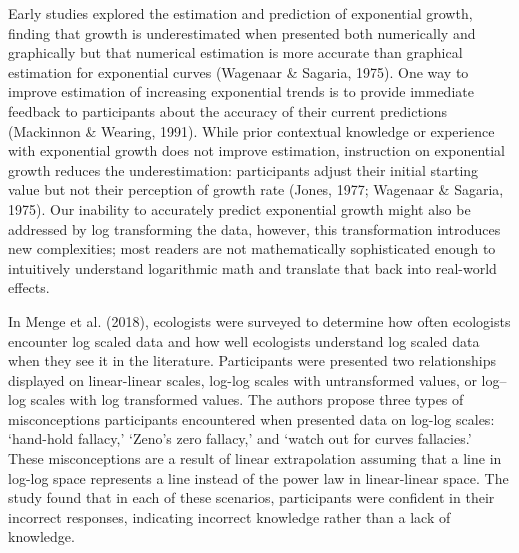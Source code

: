 \documentclass[print]{nuthesis}
\begin{document}
Early studies explored the estimation and prediction of exponential growth, finding that growth is underestimated when presented both numerically and graphically but that numerical estimation is more accurate than graphical estimation for exponential curves (Wagenaar \& Sagaria, 1975).
One way to improve estimation of increasing exponential trends is to provide immediate feedback to participants about the accuracy of their current predictions (Mackinnon \& Wearing, 1991).
While prior contextual knowledge or experience with exponential growth does not improve estimation, instruction on exponential growth reduces the underestimation: participants adjust their initial starting value but not their perception of growth rate (Jones, 1977; Wagenaar \& Sagaria, 1975).
Our inability to accurately predict exponential growth might also be addressed by log transforming the data, however, this transformation introduces new complexities; most readers are not mathematically sophisticated enough to intuitively understand logarithmic math and translate that back into real-world effects.

In Menge et al. (2018), ecologists were surveyed to determine how often ecologists encounter log scaled data and how well ecologists understand log scaled data when they see it in the literature.
Participants were presented two relationships displayed on linear-linear scales, log-log scales with untransformed values, or log--log scales with log transformed values.
The authors propose three types of misconceptions participants encountered when presented data on log-log scales: `hand-hold fallacy,' `Zeno's zero fallacy,' and `watch out for curves fallacies.'
These misconceptions are a result of linear extrapolation assuming that a line in log-log space represents a line instead of the power law in linear-linear space.
The study found that in each of these scenarios, participants were confident in their incorrect responses, indicating incorrect knowledge rather than a lack of knowledge.

\end{document}
